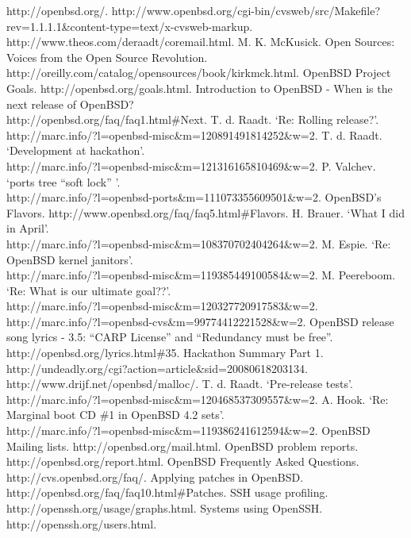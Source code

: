 \documentclass[12pt]{article}
\begin{document}
\begin{thebibliography}{99}

 http://openbsd.org/.
 http://www.openbsd.org/cgi-bin/cvsweb/src/Makefile?rev=1.1.1.1\&content-type=text/x-cvsweb-markup.
 http://www.theos.com/deraadt/coremail.html.
 M. K. McKusick. Open Sources: Voices from the Open Source Revolution. \\ http://oreilly.com/catalog/opensources/book/kirkmck.html.
 OpenBSD Project Goals. http://openbsd.org/goals.html.
 Introduction to OpenBSD - When is the next release of OpenBSD? \\ http://openbsd.org/faq/faq1.html\#Next.
 T. d. Raadt. `Re: Rolling release?'. \\ http://marc.info/?l=openbsd-misc\&m=120891491814252\&w=2.
 T. d. Raadt. `Development at hackathon'. \\ http://marc.info/?l=openbsd-misc\&m=121316165810469\&w=2.
 P. Valchev. `ports tree ``soft lock'' '. \\ http://marc.info/?l=openbsd-ports\&m=111073355609501\&w=2.
 OpenBSD's Flavors. http://www.openbsd.org/faq/faq5.html\#Flavors.
 H. Brauer. `What I did in April'. \\ http://marc.info/?l=openbsd-misc\&m=108370702404264\&w=2.
 M. Espie. `Re: OpenBSD kernel janitors'. \\ http://marc.info/?l=openbsd-misc\&m=119385449100584\&w=2.
 M. Peereboom. `Re: What is our ultimate goal??'. \\ http://marc.info/?l=openbsd-misc\&m=120327720917583\&w=2.
 http://marc.info/?l=openbsd-cvs\&m=99774412221528\&w=2.
 OpenBSD release song lyrics - 3.5: ``CARP License'' and ``Redundancy must be free''. \\ http://openbsd.org/lyrics.html\#35.
 Hackathon Summary Part 1. \\ http://undeadly.org/cgi?action=article\&sid=20080618203134.
 http://www.drijf.net/openbsd/malloc/.
 T. d. Raadt. `Pre-release tests'. \\ http://marc.info/?l=openbsd-misc\&m=120468537309557\&w=2.
 A. Hook. `Re: Marginal boot CD \#1 in OpenBSD 4.2 sets'. \\ http://marc.info/?l=openbsd-misc\&m=119386241612594\&w=2.
 OpenBSD Mailing lists. http://openbsd.org/mail.html.
 OpenBSD problem reports. http://openbsd.org/report.html.
 OpenBSD Frequently Asked Questions. http://cvs.openbsd.org/faq/.
 Applying patches in OpenBSD. http://openbsd.org/faq/faq10.html\#Patches.
 SSH usage profiling. http://openssh.org/usage/graphs.html.
 Systems using OpenSSH. http://openssh.org/users.html.

\end{thebibliography}
\end{document}
